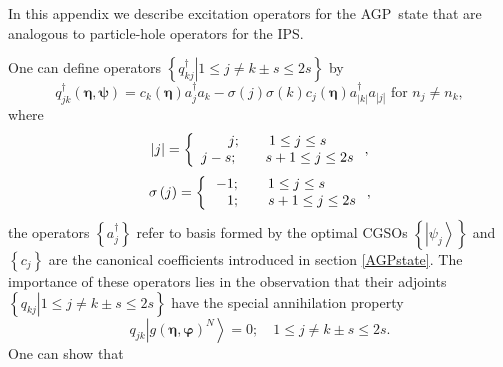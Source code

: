 \documentclass[aps,preprint]{revtex4}%
\begin{document}
In this appendix we describe excitation operators for the AGP\ state that are
analogous to particle-hole operators for the IPS.

One can define operators $\left\{  \left.  q_{kj}^{\dagger}\right\vert 1\leq
j\neq k\pm s\leq2s\right\}  $ by
\begin{equation}
q_{jk}^{\dagger}\left(  \bm{\eta,\psi}\right)  =c_{k}\left(
\bm{\eta }\right)  a_{j}^{\dagger}a_{k}-\sigma\left(  j\right)  \sigma\left(
k\right)  c_{j}\left(  \bm{\eta}\right)  a_{\left\vert k\right\vert }%
^{\dagger}a_{\left\vert j\right\vert }\text{ for }n_{j}\neq n_{k},
\end{equation}
where%
\begin{equation}
\left\vert j\right\vert =\left\{
\begin{array}
[c]{c}%
j;\qquad1\leq j\leq s\\
j-s;\qquad s+1\leq j\leq2s
\end{array}
\right.  ,
\end{equation}%
\begin{equation}
\sigma\left(  j\right)  =\left\{
\begin{array}
[c]{c}%
-1;\qquad1\leq j\leq s\quad\quad\\
\quad1;\qquad s+1\leq j\leq2s
\end{array}
\right.  ,
\end{equation}
the operators $\left\{  a_{j}^{\dagger}\right\}  $ refer to basis formed by
the optimal CGSOs $\left\{  \left\vert \psi_{j}\right\rangle \right\}  $ and
$\left\{  c_{j}\right\}  $ are the canonical coefficients introduced in
section \ref{AGPstate}. The importance of these operators lies in the
observation that their adjoints $\left\{  \left.  q_{kj}\right\vert 1\leq
j\neq k\pm s\leq2s\right\}  $ have the special annihilation property%
\begin{equation}
q_{jk}\left\vert g\left(  \bm{\eta},\bm{\varphi}\right)  ^{N}\right\rangle
=0;\quad1\leq j\neq k\pm s\leq2s.
\end{equation}
One can show \cite{Goscinski82a} that
\end{document}
